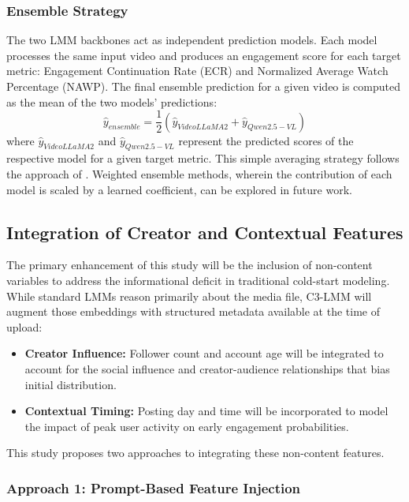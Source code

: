 \subsubsection{Ensemble Strategy}

The two LMM backbones act as independent prediction models. Each model processes the same input video and produces an engagement score for each target metric: Engagement Continuation Rate (ECR) and Normalized Average Watch Percentage (NAWP). The final ensemble prediction for a given video is computed as the mean of the two models' predictions:
\begin{equation}
    \hat{y}_{ensemble} = \frac12(\hat{y}_{VideoLLaMA2} + \hat{y}_{Qwen2.5-VL})
\end{equation}
where $\hat{y}_{VideoLLaMA2}$ and $\hat{y}_{Qwen2.5-VL}$ represent the predicted scores of the respective model for a given target metric. This simple averaging strategy follows the approach of \cite{sun2025engagement}. Weighted ensemble methods, wherein the contribution of each model is scaled by a learned coefficient, can be explored in future work.

\subsection{Integration of Creator and Contextual Features}
\label{sec:feature_integration}

The primary enhancement of this study will be the inclusion of non-content variables to address the informational deficit in traditional cold-start modeling. While standard LMMs reason primarily about the media file, C3-LMM will augment those embeddings with structured metadata available at the time of upload:
\begin{itemize}
    \item \textbf{Creator Influence:} Follower count and account age will be integrated to account for the social influence and creator-audience relationships that bias initial distribution.
    \item \textbf{Contextual Timing:} Posting day and time will be incorporated to model the impact of peak user activity on early engagement probabilities.
\end{itemize}

This study proposes two approaches to integrating these non-content features.

\subsubsection{Approach 1: Prompt-Based Feature Injection}
\label{sec:approach_1}

